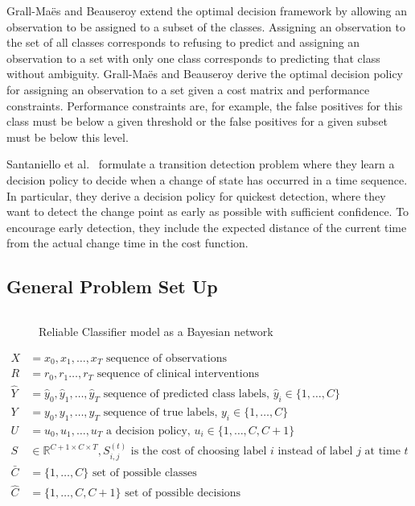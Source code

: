 \documentclass[12pt,solutions]{article}
\newcommand{\yh}{\hat{y}}
\newcommand{\R}{\mathbb{R}}
\begin{document}
Grall-Ma\"{e}s and  Beauseroy \cite{GrallMaes2009} extend the optimal decision framework by allowing an observation to be assigned to a subset of the classes. Assigning an observation to the set of all classes corresponds to refusing to predict and assigning an observation to a set with only one class corresponds to predicting that class without ambiguity. Grall-Ma\"{e}s and  Beauseroy derive the optimal decision policy for assigning an observation to a set given a cost matrix and performance constraints. Performance constraints are, for example, the false positives for this class must be below a given threshold or the false positives for a given subset must be below this level.

Santaniello et al.\ \cite{Santaniello2012} formulate a transition detection problem where they learn a decision policy to decide when a change of state has occurred in a time sequence. In particular, they derive a decision policy for quickest detection, where they want to detect the change point as early as possible with sufficient confidence. To encourage early detection, they include the expected distance of the current time from the actual change time in the cost function. 

\subsection{General Problem Set Up}

\begin{figure}[ht]
  \begin{center}
    \begin{tabular}{cc}
      
    \end{tabular}
  \end{center}
  \caption{Reliable Classifier model as a Bayesian network}
\label{fig:reclas_bnet}
\end{figure}


\begin{align*}
X &= x_0, x_1, \ldots, x_T \text{ sequence of observations}\\
R &= r_0, r_1 \ldots, r_T \text{ sequence of clinical interventions}\\
\hat{Y} &= \yh_0, \yh_1, \ldots, \yh_T \text{ sequence of predicted class labels, $\yh_i \in \{1,\ldots, C\}$}\\
Y&=y_0,y_1,\ldots,y_T \text{ sequence of true labels, $y_i \in \{1,\ldots, C\}$}\\
U&=u_0,u_1,\ldots,u_T \text{ a decision policy, $u_i \in \{1,\ldots, C, C+1\}$}\\
S &\in \R^{C+1 \times C \times T}, S_{i,j}^{(t)} \text{ is the cost of choosing label $i$ instead of label $j$ at time $t$}\\
\bar{C} &= \{1,\ldots, C\} \text{ set of possible classes}\\
\hat{C} &= \{1,\ldots, C,C+1\} \text{ set of possible decisions}
\end{align*}
\end{document}
